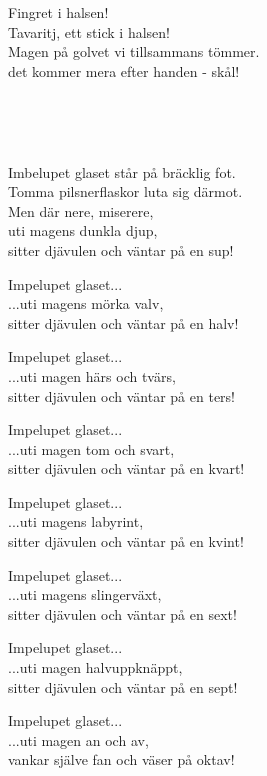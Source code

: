 
\songtext{} Fingret i halsen!\\
Tavaritj, ett stick i halsen!\\
Magen på golvet vi tillsammans tömmer.\\
det kommer mera efter handen - skål!

 \\

\newpage


 \\       

\songtext{}
Imbelupet glaset står på bräcklig fot.\\
Tomma pilsnerflaskor luta sig därmot.\\
Men där nere, miserere,\\
uti magens dunkla djup,\\
sitter djävulen och väntar på en sup!

Impelupet glaset...\\
...uti magens mörka valv,\\
sitter djävulen och väntar på en halv!

Impelupet glaset...\\
...uti magen härs och tvärs,\\
sitter djävulen och väntar på en ters!

Impelupet glaset...\\
...uti magen tom och svart,\\
sitter djävulen och väntar på en kvart!

Impelupet glaset...\\
...uti magens labyrint,\\
sitter djävulen och väntar på en kvint!

Impelupet glaset...\\
...uti magens slingerväxt,\\
sitter djävulen och väntar på en sext!

Impelupet glaset...\\
...uti magen halvuppknäppt,\\
sitter djävulen och väntar på en sept!

Impelupet glaset...\\
...uti magen an och av,\\
vankar själve fan och väser på oktav!

